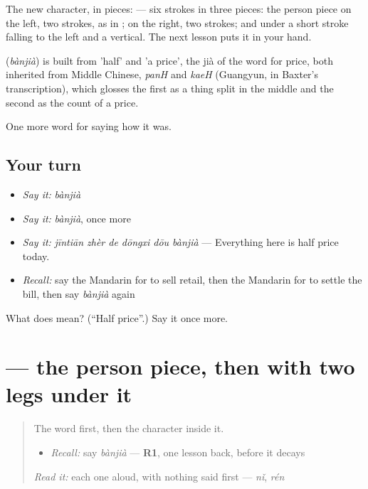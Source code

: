 The new character, in pieces:  — six strokes in three pieces: the person piece on the left, two strokes, as in ;  on the right, two strokes; and under  a short stroke falling to the left and a vertical. The next lesson puts it in your hand.

\begin{cousinweb}
\textbf{} (\emph{bànjià}) is built from  'half' and  'a price', the jià of the word for price, both inherited from Middle Chinese, \emph{panH} and \emph{kaeH} (Guangyun, in Baxter's transcription), which glosses the first as a thing split in the middle and the second as the count of a price.
\end{cousinweb}

\begin{grammarlens}[title={What you've built}]
One more word for saying how it was.
\end{grammarlens}

\subsection*{Your turn}
\begin{itemize}
\raggedright
  \item \emph{Say it:} \emph{bànjià}
  \item \emph{Say it:} \emph{bànjià}, once more
  \item \emph{Say it:} \emph{jīntiān zhèr de dōngxi dōu bànjià} — Everything here is half price today.
  \item \emph{Recall:} say the Mandarin for to sell retail, then the Mandarin for to settle the bill, then say \emph{bànjià} again
\end{itemize}

\begin{tcolorbox}[breakable,colback=teal!4,colframe=teal!35!black,title={Before you move on}]
What does  mean? (\textquotedblleft{}Half price\textquotedblright{}.) Say it once more.
\end{tcolorbox}
\section[\texorpdfstring{\zh{价} (jià)}{价 (jià)}]{ — the person piece, then  with two legs under it}

\label{lesson:ZH-W524-jia-price}



\begin{quote}
The word first, then the character inside it.

\begin{itemize}
\raggedright
  \item \emph{Recall:} say \emph{bànjià} — \textbf{R1}, one lesson back, before it decays
\end{itemize}

\begin{quote}
 
\end{quote}

\emph{Read it:} each one aloud, with nothing said first — \emph{nǐ}, \emph{rén}
\end{quote}

